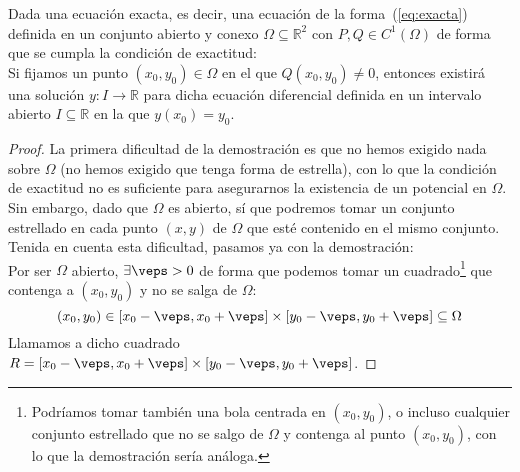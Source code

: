 \begin{prop}\label{prop:resolver_exactas}
    Dada una ecuación exacta, es decir, una ecuación de la forma~(\ref{eq:exacta}) definida en un conjunto abierto y conexo $\Omega\subseteq \mathbb{R}^2$ con $P,Q\in C^1(\Omega)$ de forma que se cumpla la condición de exactitud:\\

    Si fijamos un punto $(x_0,y_0)\in \Omega$ en el que $Q(x_0,y_0)\neq 0$, entonces existirá una solución $y:I\rightarrow\mathbb{R}$ para dicha ecuación diferencial definida en un intervalo abierto $I\subseteq \mathbb{R}$ en la que $y(x_0)=y_0$.
    \begin{proof}
        La primera dificultad de la demostración es que no hemos exigido nada sobre $\Omega$ (no hemos exigido que tenga forma de estrella), con lo que la condición de exactitud no es suficiente para asegurarnos la existencia de un potencial en $\Omega$.\\

        Sin embargo, dado que $\Omega$ es abierto, sí que podremos tomar un conjunto estrellado en cada punto $(x,y)$ de $\Omega$ que esté contenido en el mismo conjunto. Tenida en cuenta esta dificultad, pasamos ya con la demostración:\\

        Por ser $\Omega$ abierto, $\exists \veps > 0$ de forma que podemos tomar un cuadrado\footnote{Podríamos tomar también una bola centrada en $(x_0,y_0)$, o incluso cualquier conjunto estrellado que no se salgo de $\Omega$ y contenga al punto $(x_0,y_0)$, con lo que la demostración sería análoga.} que contenga a $(x_0,y_0)$ y no se salga de $\Omega$:
        \begin{equation*}
            (x_0,y_0) \in [x_0-\veps, x_0+\veps] \times [y_0-\veps,y_0+\veps] \subseteq \Omega
        \end{equation*}
        Llamamos a dicho cuadrado $R = [x_0-\veps, x_0+\veps] \times [y_0-\veps,y_0+\veps]$.


\end{proof}
\end{prop}
